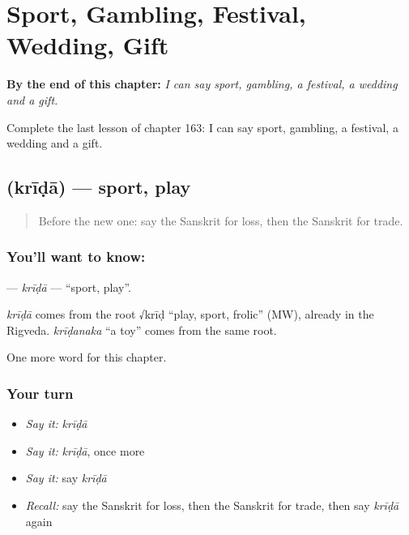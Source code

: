 
\chapter{Sport, Gambling, Festival, Wedding, Gift}
\label{ch:sa-sport-gambling-festival-wedding-gift}

\begin{chapteropening}
\textbf{By the end of this chapter:} \emph{I can say sport, gambling, a festival, a wedding and a gift.}

Complete the last lesson of chapter 163: I can say sport, gambling, a festival, a wedding and a gift.
\end{chapteropening}

\section[\texorpdfstring{\sk{क्रीडा} (krīḍā)}{क्रीडा (krīḍā)}]{ (krīḍā) — sport, play}

\label{lesson:SA-C163-krida}



\begin{quote}
Before the new one: say the Sanskrit for loss, then the Sanskrit for trade.
\end{quote}

\subsection*{You'll want to know: }
\textbf{} — \emph{krīḍā} — \textquotedblleft{}sport, play\textquotedblright{}.

\begin{cousinweb}
\emph{krīḍā} comes from the root √krīḍ \textquotedblleft{}play, sport, frolic\textquotedblright{} (MW), already in the Rigveda. \emph{krīḍanaka} \textquotedblleft{}a toy\textquotedblright{} comes from the same root.
\end{cousinweb}

\begin{grammarlens}[title={What you've built}]
One more word for this chapter.
\end{grammarlens}

\subsection*{Your turn}
\begin{itemize}
\raggedright
  \item \emph{Say it:} \emph{krīḍā}
  \item \emph{Say it:} \emph{krīḍā}, once more
  \item \emph{Say it:} say \emph{krīḍā}
  \item \emph{Recall:} say the Sanskrit for loss, then the Sanskrit for trade, then say \emph{krīḍā} again
\end{itemize}

